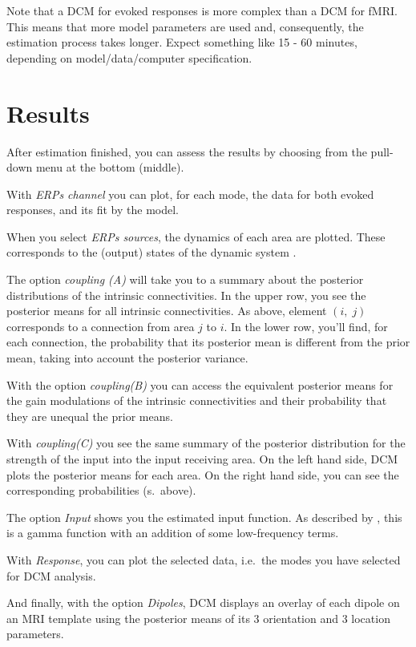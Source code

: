 Note that a DCM for evoked responses is more complex than a
DCM for fMRI. This means that more model parameters are used and,
consequently, the estimation process takes longer. Expect something
like 15 - 60 minutes, depending on model/data/computer specification.

\section{Results}After estimation finished, you can assess the results by choosing from
the pull-down menu at the bottom (middle). 

With \textit{ERPs channel} you can plot, for each mode, the data for
both evoked responses, and its fit by the model. 

When you select \textit{ERPs sources}, the dynamics of each area are
plotted. These corresponds to the (output) states of the dynamic
system \cite{od_dcm_erp}.

The option \textit{coupling (A)} will take you to a summary about the
posterior distributions of the intrinsic connectivities. In the upper
row, you see the posterior means for all intrinsic connectivities. As
above, element $(i,\; j)$ corresponds to a connection from area $j$
to $i$. In the lower row, you'll find, for each connection, the
probability that its posterior mean is different from the prior
mean, taking into account the posterior variance.

With the option \textit{coupling(B)} you can access the equivalent
posterior means for the gain modulations of the intrinsic
connectivities and their probability that they are unequal the prior
means.

With \textit{coupling(C)} you see the same summary of the posterior
distribution for the strength of the input into the input receiving
area. On the left hand side, DCM plots the posterior means for each
area. On the right hand side, you can see the corresponding
probabilities (s.~above).

The option \textit{Input} shows you the estimated input function. As
described by \cite{od_dcm_erp}, this is a gamma function with an
addition of some low-frequency terms.

With \textit{Response}, you can plot the selected data, i.e.~the modes
you have selected for DCM analysis.

And finally, with the option \textit{Dipoles}, DCM displays an
overlay of each dipole on an MRI template using the posterior means of
its 3 orientation and 3 location parameters.


 


